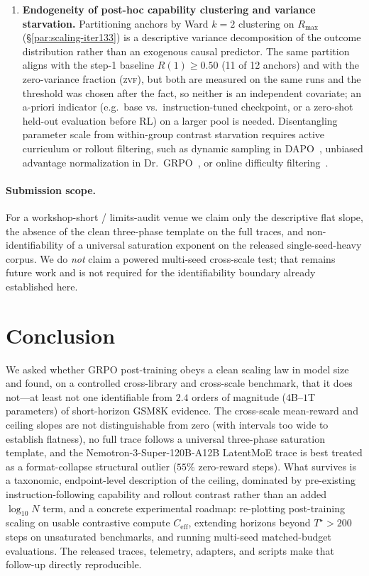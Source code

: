\begin{enumerate}[leftmargin=*,nosep]
  \item \textbf{Endogeneity of post-hoc capability clustering and variance starvation.} Partitioning anchors by Ward $k=2$ clustering on $R_{\max}$ (\S\ref{par:scaling-iter133}) is a descriptive variance decomposition of the outcome distribution rather than an exogenous causal predictor. The same partition aligns with the step-1 baseline $R(1) \ge 0.50$ (11 of 12 anchors) and with the zero-variance fraction (\textsc{zvf}), but both are measured on the same runs and the threshold was chosen after the fact, so neither is an independent covariate; an a-priori indicator (e.g.\ base vs.\ instruction-tuned checkpoint, or a zero-shot held-out evaluation before RL) on a larger pool is needed. Disentangling parameter scale from within-group contrast starvation requires active curriculum or rollout filtering, such as dynamic sampling in DAPO~\citep{yu2025dapo}, unbiased advantage normalization in Dr.\ GRPO~\citep{tong2025drgrpo}, or online difficulty filtering~\citep{bae2025online, jiang2025vcrl}.
\end{enumerate}

\paragraph{Submission scope.}
For a workshop-short / limits-audit venue we claim only the descriptive flat
slope, the absence of the clean three-phase template on the full traces, and
non-identifiability of a universal saturation exponent on the released
single-seed-heavy corpus. We do \emph{not} claim a powered multi-seed
cross-scale test; that remains future work and is not required for the
identifiability boundary already established here.

\section{Conclusion}
\label{sec:p1-conclusion}
We asked whether GRPO post-training obeys a clean scaling law in model size and
found, on a controlled cross-library and cross-scale benchmark, that it does not---at least not
one identifiable from $2.4$ orders of magnitude ($4$B--$1$T parameters) of short-horizon GSM8K evidence. The
cross-scale mean-reward and ceiling slopes are not distinguishable from zero (with intervals too wide to
establish flatness), no full trace follows a universal three-phase saturation template, and the Nemotron-3-Super-120B-A12B LatentMoE trace is best treated
as a format-collapse structural outlier ($55\%$ zero-reward steps). What survives is a taxonomic, endpoint-level
description of the ceiling, dominated by pre-existing instruction-following capability and rollout contrast rather
than an added $\log_{10} N$ term, and a concrete experimental roadmap:
re-plotting post-training scaling on usable contrastive compute $C_{\text{eff}}$, extending horizons beyond $T^\star > 200$ steps on unsaturated benchmarks, and running multi-seed matched-budget evaluations. The released traces, telemetry, adapters, and scripts make that follow-up directly reproducible.
